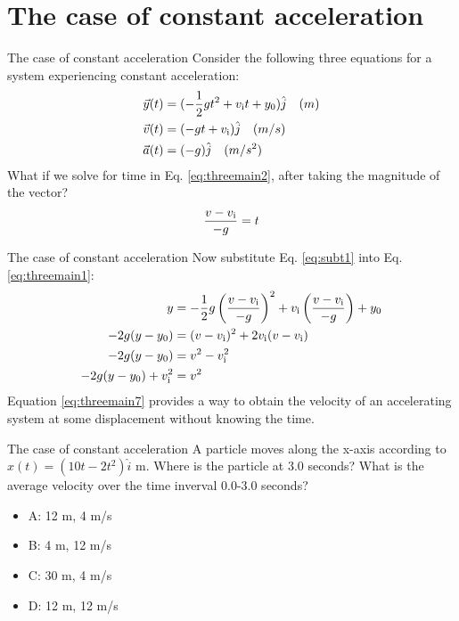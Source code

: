 \documentclass{beamer}
\begin{document}
\section{The case of constant acceleration}

\begin{frame}{The case of constant acceleration}
Consider the following three equations for a system experiencing constant acceleration:
\begin{align}
\vec{y}(t) &= (-\frac{1}{2}gt^2+v_{\rm i}t+y_{\rm 0}) \hat{j} \quad (m) \label{eq:threemain1} \\
\vec{v}(t) &= (-gt + v_{\rm i}) \hat{j} \quad (m/s) \label{eq:threemain2} \\
\vec{a}(t) &= (-g) \hat{j} \quad (m/s^2) \label{eq:threemain3}
\end{align}
What if we solve for time in Eq. \ref{eq:threemain2}, after taking the magnitude of the vector? \\
\begin{equation}
\frac{v-v_{\rm i}}{-g} = t
\label{eq:subt1}
\end{equation}
\end{frame}

\begin{frame}{The case of constant acceleration}
Now substitute Eq. \ref{eq:subt1} into Eq. \ref{eq:threemain1}:\\
\begin{align}
y &= -\frac{1}{2}g\left(\frac{v-v_{\rm i}}{-g}\right)^2+v_{\rm i}\left(\frac{v-v_{\rm i}}{-g}\right)+y_{\rm 0} \label{eq:threemain4} \\ 
-2g(y-y_{\rm 0}) &= (v-v_{\rm i})^2 + 2v_{\rm i}(v-v_{\rm i}) \label{eq:threemain5} \\
-2g(y-y_{\rm 0}) &= v^2-v_{\rm i}^2 \label{eq:threemain6} \\
-2g(y-y_{\rm 0})+v_{\rm i}^2 &= v^2 \label{eq:threemain7}
\end{align}
Equation \ref{eq:threemain7} provides a way to obtain the velocity of an accelerating system at some displacement without knowing the time.
\end{frame}

\begin{frame}{The case of constant acceleration}
A particle moves along the x-axis according to $x(t) = (10t-2t^2)\hat{i}$ m.  Where is the particle at 3.0 seconds?  What is the average velocity over the time inverval 0.0-3.0 seconds?
\begin{itemize}
\item A: 12 m, 4 m/s
\item B: 4 m, 12 m/s
\item C: 30 m, 4 m/s
\item D: 12 m, 12 m/s
\end{itemize}
\end{frame}
\end{document}
